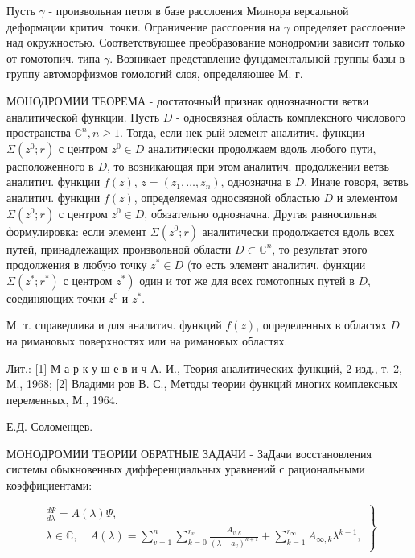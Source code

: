 \documentclass[10pt]{article}
\begin{document}
Пусть $\gamma$ - произвольная петля в базе расслоения Милнора версальной деформации критич. точки. Ограничение расслоения на $\gamma$ определяет расслоение над окружностью. Соответствующее преобразование монодромии зависит только от гомотопич. типа $\gamma$. Возникает представление фундаментальной группы базы в группу автоморфизмов гомологий слоя, определяюшее М. г.



МОНОДРОМИИ ТЕОРЕМА - достаточныЙ признак однозначности ветви аналитической функции. Пусть $D$ - односвязная область комплексного числового пространства $\mathbb{C}^{n}, n \geqslant 1$. Тогда, если нек-рый элемент аналитич. функции $\Sigma\left(z^{0} ; r\right)$ с центром $z^{0} \in D$ аналитически продолжаем вдоль любого пути, расположенного в $D$, то возникающая при этом аналитич. продолжении ветвь аналитич. функции $f(z)$, $z=\left(z_{1}, \ldots, z_{n}\right)$, однозначна в $D$. Иначе говоря, ветвь аналитич. функции $f(z)$, определяемая односвязной областью $D$ и элементом $\Sigma\left(z^{0} ; r\right)$ с центром $z^{0} \in D$, обязательно однозначна. Другая равносильная формулировка: если элемент $\Sigma\left(z^{0} ; r\right)$ аналитически продолжается вдоль всех путей, принадлежащих произвольной области $D \subset \mathbb{C}^{n}$, то результат этого продолжения в любую точку $z^{*} \in D$ (то есть элемент аналитич. функции $\Sigma\left(z^{*} ; r^{*}\right)$ с центром $\left.z^{*}\right)$ один и тот же для всех гомотопных путей в $D$, соединяющих точки $z^{0}$ и $z^{*}$.



М. т. справедлива и для аналитич. функций $f(z)$, определенных в областях $D$ на римановых поверхностях или на римановых областях.



Лит.: [1] М а р к у ш е в и ч А. И., Теория аналитических функций, 2 изд., т. 2, М., 1968; [2] Владими ров В. С., Методы теории функций многих комплексных переменных, М., 1964.



Е.Д. Соломенцев.



МОНОДРОМИИ ТЕОРИИ ОБРАТНЫЕ ЗАДАЧИ - ЗаДачи восстановления системы обыкновенных дифференциальных уравнений с рациональными коэффициентами:



\[

\left.\begin{array}{c}

\frac{d \Psi}{d \lambda}=A(\lambda) \Psi, \\

\lambda \in \mathbb{C}, \quad A(\lambda)=\sum_{v=1}^{n} \sum_{k=0}^{r_{v}} \frac{A_{v, k}}{\left(\lambda-a_{v}\right)^{k+1}}+\sum_{k=1}^{r_{\infty}} A_{\infty, k} \lambda^{k-1},

\end{array}\right\}

\]
\end{document}
